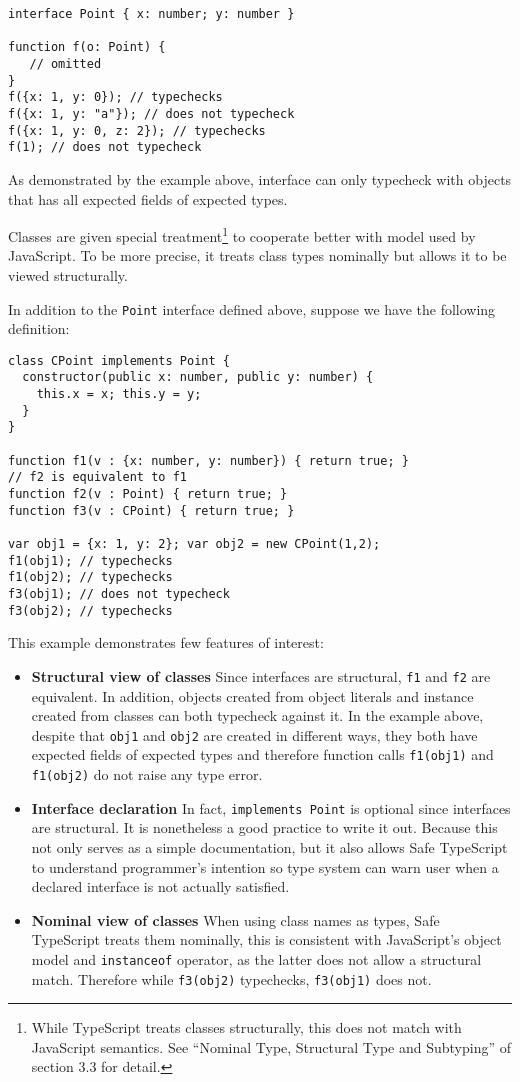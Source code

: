 \begin{verbatim}
interface Point { x: number; y: number }

function f(o: Point) {
   // omitted
}
f({x: 1, y: 0}); // typechecks
f({x: 1, y: "a"}); // does not typecheck
f({x: 1, y: 0, z: 2}); // typechecks
f(1); // does not typecheck
\end{verbatim}

As demonstrated by the example above,
interface can only typecheck with objects that has all expected fields of expected types.

Classes are given special treatment\footnote{While TypeScript treats classes structurally,
	this does not match with JavaScript semantics. See ``Nominal Type, Structural Type and Subtyping''
	of section 3.3 for detail.
} to cooperate better with model used by JavaScript. To be more precise,
it treats class types nominally but allows it to be viewed structurally.

In addition to the \texttt{Point} interface defined above,
suppose we have the following definition:

\begin{verbatim}
class CPoint implements Point {
  constructor(public x: number, public y: number) {
    this.x = x; this.y = y;
  }
}

function f1(v : {x: number, y: number}) { return true; }
// f2 is equivalent to f1
function f2(v : Point) { return true; }
function f3(v : CPoint) { return true; }

var obj1 = {x: 1, y: 2}; var obj2 = new CPoint(1,2);
f1(obj1); // typechecks
f1(obj2); // typechecks 
f3(obj1); // does not typecheck
f3(obj2); // typechecks  
\end{verbatim}

This example demonstrates few features of interest:

\begin{itemize}
	\item \textbf{Structural view of classes}
	Since interfaces are structural, \texttt{f1} and \texttt{f2} are equivalent.
	In addition,
	objects created from object literals and instance created from classes can both typecheck against it.
	In the example above, despite that \texttt{obj1} and \texttt{obj2} are created in different ways,
	they both have expected fields of expected types and therefore function calls \texttt{f1(obj1)}
	and \texttt{f1(obj2)} do not raise any type error.
	\item \textbf{Interface declaration}
	In fact, \texttt{implements Point} is optional since interfaces are structural.
	It is nonetheless a good practice to write it out.
	Because this not only serves as a simple documentation,
	but it also allows Safe TypeScript to understand programmer's intention
	so type system can warn user when a declared interface is not actually satisfied.
	\item \textbf{Nominal view of classes} When using class names as types,
	Safe TypeScript treats them nominally, this is consistent with
	JavaScript's object model and \texttt{instanceof} operator, as the latter does not allow a structural
	match.
	Therefore while \texttt{f3(obj2)} typechecks, \texttt{f3(obj1)} does not.
\end{itemize}

